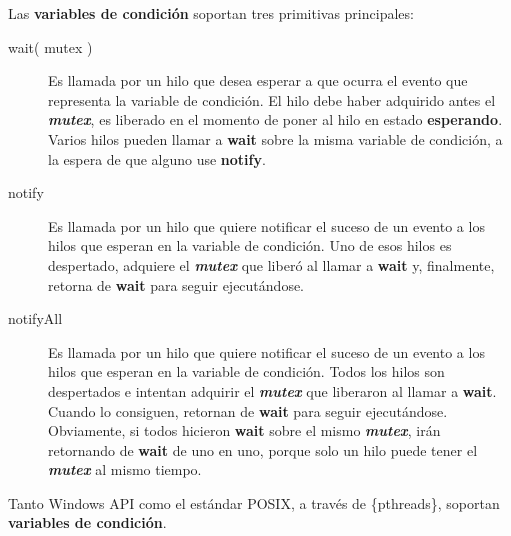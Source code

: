 Las \textbf{variables de condición} soportan tres primitivas
principales:

\begin{description}
\item[wait( mutex )]
Es llamada por un hilo que desea esperar a que ocurra el evento que
representa la variable de condición. El hilo debe haber adquirido antes
el \textbf{\emph{mutex}}, es liberado en el momento de poner al hilo en
estado \textbf{esperando}. Varios hilos pueden llamar a \textbf{wait}
sobre la misma variable de condición, a la espera de que alguno use
\textbf{notify}.
\item[notify]
Es llamada por un hilo que quiere notificar el suceso de un evento a los
hilos que esperan en la variable de condición. Uno de esos hilos es
despertado, adquiere el \textbf{\emph{mutex}} que liberó al llamar a
\textbf{wait} y, finalmente, retorna de \textbf{wait} para seguir
ejecutándose.
\item[notifyAll]
Es llamada por un hilo que quiere notificar el suceso de un evento a los
hilos que esperan en la variable de condición. Todos los hilos son
despertados e intentan adquirir el \textbf{\emph{mutex}} que liberaron
al llamar a \textbf{wait}. Cuando lo consiguen, retornan de
\textbf{wait} para seguir ejecutándose. Obviamente, si todos hicieron
\textbf{wait} sobre el mismo \textbf{\emph{mutex}}, irán retornando de
\textbf{wait} de uno en uno, porque solo un hilo puede tener el
\textbf{\emph{mutex}} al mismo tiempo.
\end{description}

Tanto Windows API como el estándar POSIX, a través de \{pthreads\},
soportan \textbf{variables de condición}.

